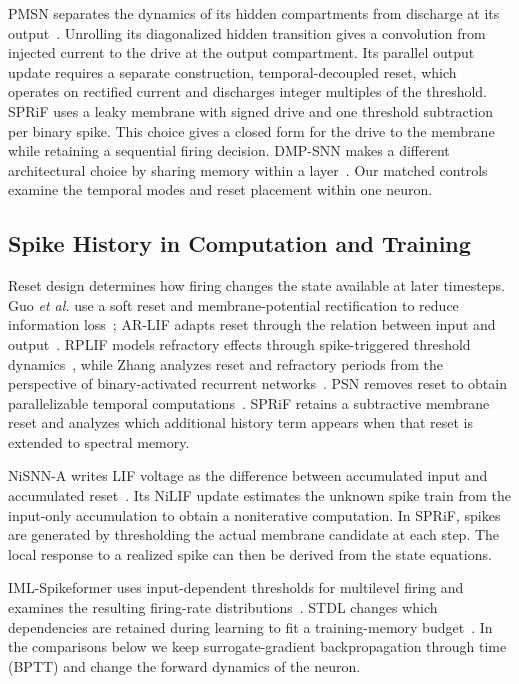 \documentclass[letterpaper,journal]{IEEEtran}
\begin{document}
PMSN separates the dynamics of its hidden compartments from discharge at its output~\cite{pmsn2026}. Unrolling its diagonalized hidden transition gives a convolution from injected current to the drive at the output compartment. Its parallel output update requires a separate construction, temporal-decoupled reset, which operates on rectified current and discharges integer multiples of the threshold. SPRiF uses a leaky membrane with signed drive and one threshold subtraction per binary spike. This choice gives a closed form for the drive to the membrane while retaining a sequential firing decision. DMP-SNN makes a different architectural choice by sharing memory within a layer~\cite{sun2026dmp}. Our matched controls examine the temporal modes and reset placement within one neuron.

\subsection{Spike History in Computation and Training}

Reset design determines how firing changes the state available at later timesteps. Guo \emph{et al.} use a soft reset and membrane-potential rectification to reduce information loss~\cite{inflor}; AR-LIF adapts reset through the relation between input and output~\cite{arlif}. RPLIF models refractory effects through spike-triggered threshold dynamics~\cite{rplif}, while Zhang analyzes reset and refractory periods from the perspective of binary-activated recurrent networks~\cite{zhang2025reset}. PSN removes reset to obtain parallelizable temporal computations~\cite{psn}. SPRiF retains a subtractive membrane reset and analyzes which additional history term appears when that reset is extended to spectral memory.

NiSNN-A writes LIF voltage as the difference between accumulated input and accumulated reset~\cite{nisnna2025}. Its NiLIF update estimates the unknown spike train from the input-only accumulation to obtain a noniterative computation. In SPRiF, spikes are generated by thresholding the actual membrane candidate at each step. The local response to a realized spike can then be derived from the state equations.

IML-Spikeformer uses input-dependent thresholds for multilevel firing and examines the resulting firing-rate distributions~\cite{imlspikeformer2026}. STDL changes which dependencies are retained during learning to fit a training-memory budget~\cite{stdl2026}. In the comparisons below we keep surrogate-gradient backpropagation through time (BPTT) and change the forward dynamics of the neuron.
\end{document}
